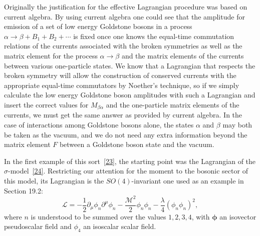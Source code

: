 Originally the justification for the effective Lagrangian procedure was based on current algebra. By using current algebra one could see that the amplitude for emission of a set of low energy Goldstone bosons in a process $\alpha\to\beta+B_1+B_2+\cdots$ is fixed once one knows the equal-time commutation relations of the currents associated with the broken symmetries as well as the matrix element for the process $\alpha\to\beta$ and the matrix elements of the currents between various one-particle states. We know that a Lagrangian that respects the broken symmetry will allow the construction of conserved currents with the appropriate equal-time commutators by Noether's technique, so if we simply calculate the low energy Goldstone boson amplitudes with such a Lagrangian and insert the correct values for $M_{\beta\alpha}$ and the one-particle matrix elements of the currents, we must get the same answer as provided by current algebra. In the case of interactions among Goldstone bosons alone, the states $\alpha$ and $\beta$ may both be taken as the vacuum, and we do not need any extra information beyond the matrix element $F$ between a Goldstone boson state and the vacuum.

In the first example of this sort~\hyperref[ch19-ref-23]{[23]}, the starting point was the Lagrangian of the $\sigma$-model~\hyperref[ch19-ref-24]{[24]}. Restricting our attention for the moment to the bosonic sector of this model, its Lagrangian is the $SO(4)$-invariant one used as an example in Section 19.2:
\begin{equation}
\mathcal L
=-\frac{1}{2}\partial_\mu\phi_n\partial^\mu\phi_n
-\frac{\mathcal M^2}{2}\phi_n\phi_n
-\frac{\lambda}{4}(\phi_n\phi_n)^2,
\tag{19.5.1}\label{eq:19.5.1}
\end{equation}
where $n$ is understood to be summed over the values $1,2,3,4$, with $\boldsymbol{\phi}$ an isovector pseudoscalar field and $\phi_4$ an isoscalar scalar field.


